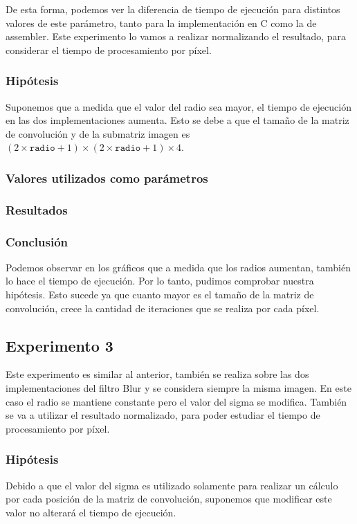 		De esta forma, podemos ver la diferencia de tiempo de ejecución para distintos valores de este parámetro, tanto para la implementación en C como la de assembler. Este experimento lo vamos a realizar normalizando el resultado, para considerar el tiempo de procesamiento por píxel.

		\subsubsection{Hipótesis} 
			Suponemos que a medida que el valor del radio sea mayor, el tiempo de ejecución en las dos implementaciones aumenta. Esto se debe a que el tamaño de la matriz de convolución y de la submatriz imagen es $(2 \times \mathtt{radio} + 1) \times (2 \times \mathtt{radio} + 1) \times 4$. 

		\subsubsection{Valores utilizados como parámetros} 

		\subsubsection{Resultados}

		\subsubsection{Conclusión}
			Podemos observar en los gráficos que a medida que los radios aumentan, también lo hace el tiempo de ejecución. Por lo tanto, pudimos comprobar nuestra hipótesis. Esto sucede ya que cuanto mayor es el tamaño de la matriz de convolución, crece la cantidad de iteraciones que se realiza por cada píxel.

			


	\subsection{Experimento 3}
		Este experimento es similar al anterior, también se realiza sobre las dos implementaciones del filtro Blur y se considera siempre la misma imagen. En este caso el radio se mantiene constante pero el valor del sigma se modifica. También se va a utilizar el resultado normalizado, para poder estudiar el tiempo de procesamiento por píxel. 

		\subsubsection{Hipótesis} 
			Debido a que el valor del sigma es utilizado solamente para realizar un cálculo por cada posición de la matriz de convolución, suponemos que modificar este valor no alterará el tiempo de ejecución.

